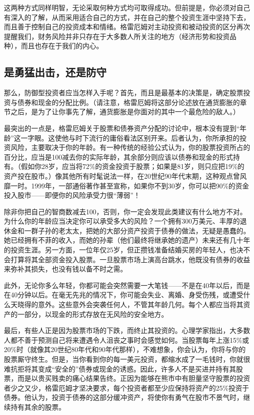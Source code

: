 \documentclass[12pt,oneside]{book}
\begin{document}
这两种方式同样明智，无论采取何种方式均可取得成功。但前提是，你必须对自己有深入的了解，从而采用适合自己的方式，并在自己的整个投资生涯中坚持下去，而且善于控制自己的投资成本和情绪。格雷厄姆对主动投资和被动投资的区分再次提醒我们，财务风险并非只存在于大多数人所关注的地方（经济形势和投资品种），而且也存在于我们的内心。

\subsection{是勇猛出击，还是防守}
那么，防御型投资者应当怎样入手呢？首先，而且是最基本的决策是，确定股票投资与债券和现金的分配比例。（请注意，格雷厄姆将这部分论述放在通货膨胀的章节之后，是为了让你事先了解，通货膨胀是你面对的其中一个最危险的敌人。）

最突出的一点是，格雷厄姆关于股票和债券资产分配的讨论中，根本没有提到“年龄”这一字眼。这使他与时下流行的庸俗看法区别开来。后者认为，你所承担的投资风险，主要取决于你的年龄。有一种传统的经验公式认为，你的股票投资所占的百分比，应当是100减去你的实际年龄，其余部分则应该以债券和现金的形式持有。（假如你28岁，应当将72\%的资金投资于股票；如果是81岁，则只应把19\%的资产投在股市。）像其他所有时髦说法一样，在20世纪90年代末期，这种观点曾风靡一时。1999年，一部通俗著作甚至宣称，如果你不到30岁，你可以把90\%的资金投入股市——即便你的风险承受力很“薄弱”！

除非你把自己的智商数减去100，否则，你一定会发现此类建议有什么地方不对。为什么你的年龄应当决定你可以承受多大的风险？一个拥有300万美元、丰厚的退休金和一群子孙的老太太，把她的大部分资产投资于债券的做法，无疑是愚蠢的。她已经拥有不菲的收入，而她的孙辈（他们最终将继承她的遗产）未来还有几十年的投资生涯。另一方面，一位年仅25岁，但正攒钱准备结婚买房的年轻人，也决不会打算将其全部资金投入股票。一旦股票市场上演高台跳水，他既没有债券的收益来弥补其损失，也没有钱以备不时之需。

此外，无论你多么年轻，你都可能会突然需要一大笔钱——不是在40年以后，而是在40分钟以后。在毫无先兆的情况下，你可能会失业、离婚、身受伤残，或遭受什么天晓得的意外。这些意外会突袭任何人，不管其年龄几何。每个人都应当将其资产的一部分，以现金的形式存放在无风险的安全地方。

最后，有些人正是因为股票市场的下跌，而终止其投资的。心理学家指出，大多数人都不善于预测自己将来遭遇令人沮丧之事时会感觉如何。当股票每年上涨15\%或20\%时（就像其20世纪80年代和90年代那样），不难想象，你会认为，你将与你的股票厮守终生。但是，当你看到你的每一美元投资，都缩水成了一毛钱时，你就很难抗拒将其变成“安全的”债券或现金的诱惑。因此，许多人不是买进并持有其股票，而是以贵买贱卖的痛心结果告终。正因为能够在熊市中有胆量坚守股票的投资者少之又少，格雷厄姆才坚决要求，每个投资者都至少应保持将资产的25\%投资于债券。他认为，投资于债券的这部分缓冲资产，将使你有勇气在股市不景气时，继续持有其余的股票。
\end{document}
